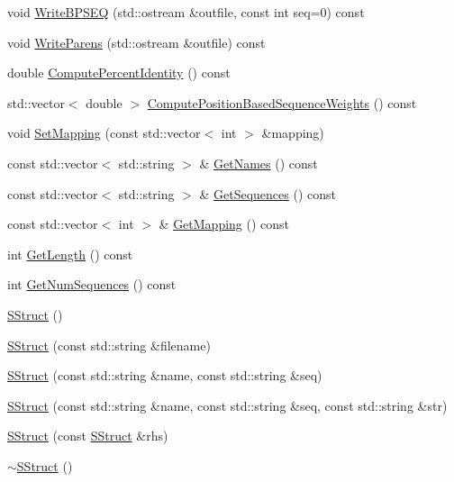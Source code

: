 \begin{DoxyCompactItemize}
\item 
void \hyperlink{class_s_struct_ac81e8f499dfaf6a4651569e9ee7ade27}{Write\+B\+P\+S\+E\+Q} (std\+::ostream \&outfile, const int seq=0) const 
\item 
void \hyperlink{class_s_struct_a6b12fb398bcf932a1cc414b8f6da0648}{Write\+Parens} (std\+::ostream \&outfile) const 
\item 
double \hyperlink{class_s_struct_abcab3b62ee1c201279042de4fdf3bd3f}{Compute\+Percent\+Identity} () const 
\item 
std\+::vector$<$ double $>$ \hyperlink{class_s_struct_acdb93561a8330235e2bf0dae94c3d1f2}{Compute\+Position\+Based\+Sequence\+Weights} () const 
\item 
void \hyperlink{class_s_struct_a9a2bebbc61b1ff49a5599c8d72930809}{Set\+Mapping} (const std\+::vector$<$ int $>$ \&mapping)
\item 
const std\+::vector$<$ std\+::string $>$ \& \hyperlink{class_s_struct_a8d05e53d2524b32080f441527ee20ec1}{Get\+Names} () const 
\item 
const std\+::vector$<$ std\+::string $>$ \& \hyperlink{class_s_struct_ab18d689824218cacd1bf24d415ab82b9}{Get\+Sequences} () const 
\item 
const std\+::vector$<$ int $>$ \& \hyperlink{class_s_struct_a0a66c20e7cbc8978c759b38175f73dd3}{Get\+Mapping} () const 
\item 
int \hyperlink{class_s_struct_aa65cacd4668b451b6ca001c08a6005ec}{Get\+Length} () const 
\item 
int \hyperlink{class_s_struct_ac8f28842bd2186097b30be7ccabd7933}{Get\+Num\+Sequences} () const 
\item 
\hyperlink{class_s_struct_a58ee9a2053b13b24116b6a47be23e82f}{S\+Struct} ()
\item 
\hyperlink{class_s_struct_ae80ebc2151d3d69bdb8c0c6c062bbef1}{S\+Struct} (const std\+::string \&filename)
\item 
\hyperlink{class_s_struct_ad1c01bd81866307b6599483581ac55b9}{S\+Struct} (const std\+::string \&name, const std\+::string \&seq)
\item 
\hyperlink{class_s_struct_a4aa6cec1d329227ea7eb06dbd18fd3cd}{S\+Struct} (const std\+::string \&name, const std\+::string \&seq, const std\+::string \&str)
\item 
\hyperlink{class_s_struct_ac9dba145eeade69038b9f29cbc1ca7b5}{S\+Struct} (const \hyperlink{class_s_struct}{S\+Struct} \&rhs)
\item 
\hyperlink{class_s_struct_aef472f81f252999a8fa9d8f56c6026e2}{$\sim$\+S\+Struct} ()

\end{DoxyCompactItemize}

